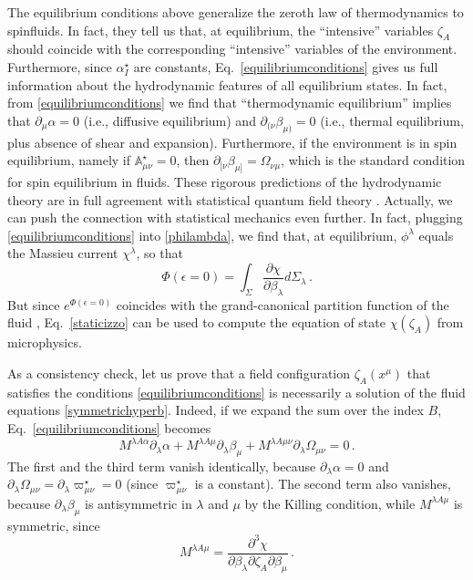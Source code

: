\documentclass[12pt,aps,prd,nofootinbib,noshowkeys,noshowpacs,longbibliography,
superscriptaddress,tightenlines,floatfix,preprintnumbers]{revtex4-2}
\begin{document}
The equilibrium conditions above generalize the zeroth law of thermodynamics \cite{GavassinoTermometri} to spinfluids. In fact, they tell us that, at equilibrium, the ``intensive'' variables $\zeta_A$ should coincide with the corresponding ``intensive'' variables of the environment. Furthermore, since $\alpha^\star_I$ are constants, Eq.~\eqref{equilibriumconditions} gives us full information about the hydrodynamic features of all equilibrium states. In fact, from \eqref{equilibriumconditions} we find that ``thermodynamic equilibrium'' implies that $\partial_\mu \alpha=0$ (i.e., diffusive equilibrium) and $\partial_{(\nu}\beta_{\mu)}=0$ (i.e., thermal equilibrium, plus absence of shear and expansion). Furthermore, if the environment is in spin equilibrium, namely if $\mathbb{A}_{\mu \nu}^\star=0$, then $\partial_{[\nu}\beta_{\mu]}=\Omega_{\nu \mu}$, which is the standard condition for spin equilibrium in fluids. These rigorous predictions of the hydrodynamic theory are in full agreement with statistical quantum field theory \cite{Speranza:2020ilk,Becattini:2023ouz,Becattini:2025oyi}. Actually, we can push the connection with statistical mechanics even further. In fact, plugging \eqref{equilibriumconditions} into \eqref{philambda}, we find that, at equilibrium, $\phi^\lambda$ equals the Massieu current $\chi^\lambda$, so that
\begin{equation}\label{staticizzo}
    \Phi(\epsilon=0) = \int_\Sigma \dfrac{\partial \chi}{\partial \beta_\lambda} d\Sigma_\lambda \, .
\end{equation}
But since $e^{\Phi(\epsilon=0)}$ coincides with the grand-canonical partition function of the fluid \cite{GibbonsHawking1977}, Eq.~\eqref{staticizzo} can be used to compute the equation of state $\chi(\zeta_A)$ from microphysics.


As a consistency check, let us prove that a field configuration $\zeta_A(x^\mu)$ that satisfies the conditions \eqref{equilibriumconditions} is necessarily a solution of the fluid equations \eqref{symmetrichyperb}. Indeed, if we expand the sum over the index $B$, Eq.~\eqref{equilibriumconditions} becomes
\begin{equation}
     M^{\lambda A \alpha}\partial_\lambda \alpha +  M^{\lambda A \mu}\partial_\lambda \beta_\mu +M^{\lambda A \mu \nu}\partial_\lambda \Omega_{\mu \nu}=0 \, .
\end{equation}
The first and the third term vanish identically, because $\partial_\lambda \alpha=0$ and $\partial_\lambda \Omega_{\mu \nu}=\partial_\lambda \varpi^\star_{\mu \nu}=0$ (since $\varpi^\star_{\mu \nu}$ is a constant). The second term also vanishes, because $\partial_{\lambda}\beta_{\mu}$ is antisymmetric in $\lambda$ and $\mu$ by the Killing condition, while $M^{\lambda A \mu}$ is symmetric, since
\begin{equation}
    M^{\lambda A \mu}= \dfrac{\partial^3 \chi}{\partial \beta_\lambda \partial \zeta_A \partial \beta_\mu} \, .
\end{equation}
\end{document}
